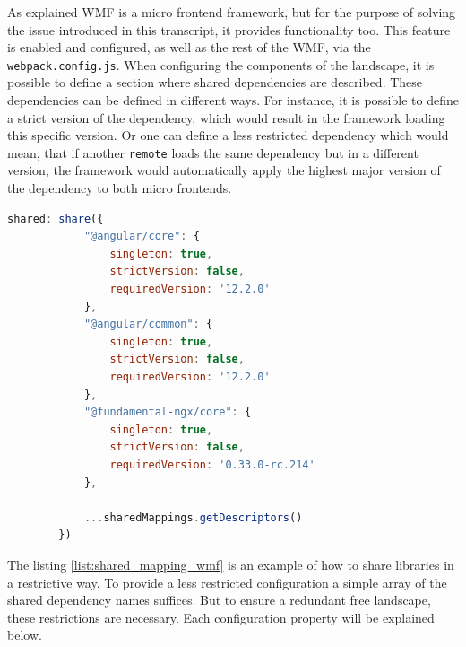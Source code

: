 As explained WMF is a micro frontend framework, but for the purpose of solving the issue introduced in this transcript, it provides functionality too.
This feature is enabled and configured, as well as the rest of the WMF, via the \texttt{webpack.config.js}. When configuring the components of the landscape, it is possible to define a section where shared dependencies are described. These dependencies can be defined in different ways. For instance, it is possible to define a strict version of the dependency, which would result in the framework loading this specific version. Or one can define a less restricted dependency which would mean, that if another \texttt{remote} loads the same dependency but in a different version, the framework would automatically apply the highest major version of the dependency to both micro frontends.
\newpage
\begin{lstlisting}[language=JavaScript, caption=Example of sharing dependencies configured in the \texttt{webpack.config.js}, label=list:shared_mapping_wmf,  xleftmargin=.01\textwidth, xrightmargin=.01\textwidth]
	  shared: share({
			"@angular/core": { 
				singleton: true, 
				strictVersion: false, 
				requiredVersion: '12.2.0' 
			},
			"@angular/common": { 
				singleton: true, 
				strictVersion: false, 
				requiredVersion: '12.2.0' 
			},
			"@fundamental-ngx/core": { 
				singleton: true, 
				strictVersion: false, 
				requiredVersion: '0.33.0-rc.214' 
			},
			
			...sharedMappings.getDescriptors()
		})
\end{lstlisting}

The listing \ref{list:shared_mapping_wmf} is an example of how to share libraries in a restrictive way. To provide a less restricted configuration a simple array of the shared dependency names suffices. But to ensure a redundant free landscape, these restrictions are necessary. Each configuration property will be explained below.

